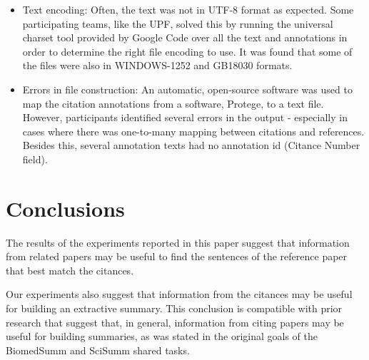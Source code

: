 \documentclass[11pt]{article}
\begin{document}
\begin{itemize}
\item{Text encoding: Often, the text was not in UTF-8 format as expected}. Some participating teams, like the UPF, solved this by running the universal charset tool provided by Google Code over all the text and annotations in order to determine the right file encoding to use. It was found that some of the files were also in WINDOWS-1252 and GB18030 formats.
\item{Errors in file construction:} An automatic, open-source software was used to map the citation annotations from a software, Protege, to a text file. However, participants identified several errors in the output -  especially in cases where there was one-to-many mapping between citations and references. Besides this, several annotation texts had no annotation id (Citance Number field). 
\end{itemize}

\section{Conclusions}

The results of the experiments reported in this paper suggest that information from related papers may be useful to find the sentences of the reference paper that best match the citances. 

Our experiments also suggest that information from the citances may be useful for building an extractive summary. This conclusion is compatible with prior research that suggest that, in general, information from citing papers may be useful for building summaries, as was stated in the original goals of the BiomedSumm and SciSumm shared tasks.




\end{document}
